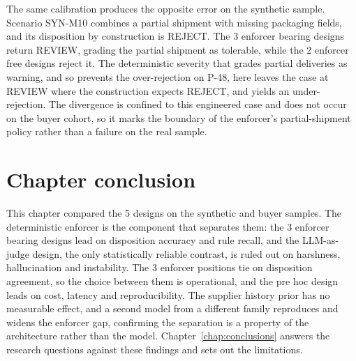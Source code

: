 The same calibration produces the opposite error on the synthetic sample. Scenario SYN-M10 combines a partial shipment with missing packaging fields, and its disposition by construction is REJECT. The 3 enforcer bearing designs return REVIEW, grading the partial shipment as tolerable, while the 2 enforcer free designs reject it. The deterministic severity that grades partial deliveries as warning, and so prevents the over-rejection on P-48, here leaves the case at REVIEW where the construction expects REJECT, and yields an under-rejection. The divergence is confined to this engineered case and does not occur on the buyer cohort, so it marks the boundary of the enforcer's partial-shipment policy rather than a failure on the real sample.



\section{Chapter conclusion}
\label{sec:results:conclusion}

This chapter compared the 5 designs on the synthetic and buyer samples. The deterministic enforcer is the component that separates them: the 3 enforcer bearing designs lead on disposition accuracy and rule recall, and the LLM-as-judge design, the only statistically reliable contrast, is ruled out on harshness, hallucination and instability. The 3 enforcer positions tie on disposition agreement, so the choice between them is operational, and the pre hoc design leads on cost, latency and reproducibility. The supplier history prior has no measurable effect, and a second model from a different family reproduces and widens the enforcer gap, confirming the separation is a property of the architecture rather than the model. Chapter~\ref{chap:conclusions} answers the research questions against these findings and sets out the limitations.
